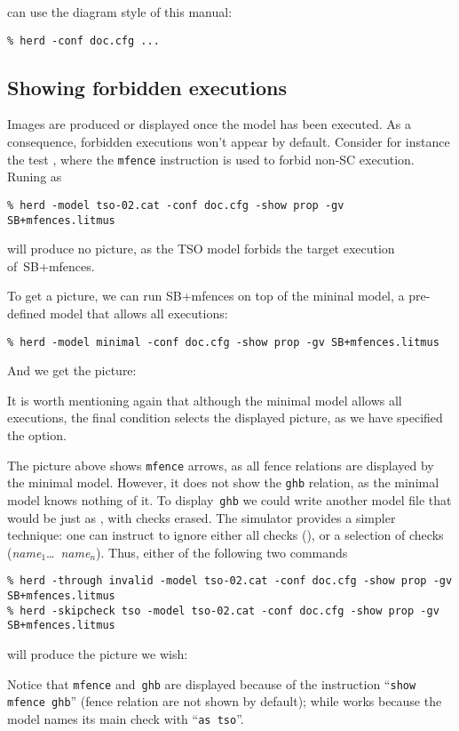can use the diagram style of this manual:
\begin{verbatim}
% herd -conf doc.cfg ...
\end{verbatim}

\subsection{\label{show:forbidden}Showing forbidden executions}
Images are produced or displayed once the model has been executed.
As a consequence,
forbidden executions won't appear by default.
Consider for instance the test ,
where the \texttt{mfence} instruction is used to forbid
 non-SC execution. Runing \herd{} as
\begin{verbatim}
% herd -model tso-02.cat -conf doc.cfg -show prop -gv SB+mfences.litmus
\end{verbatim}
will produce no picture, as the TSO model forbids the target execution
of~\textsf{SB+mfences}.

To get a picture, we can run \textsf{SB+mfences} on top of the mininal
model, a pre-defined model that allows all executions:
\begin{verbatim}
% herd -model minimal -conf doc.cfg -show prop -gv SB+mfences.litmus
\end{verbatim}
And we get the picture:
\begin{center}\end{center}
It is worth mentioning again  that although the minimal model allows all
executions, the final condition
selects the displayed picture, as we have specified the
 option.


\label{name:check}The picture above shows \verb+mfence+ arrows, as all
fence relations are displayed by the minimal model.
However, it  does not show the \verb+ghb+ relation, as the minimal
model knows nothing of it.
To display~\verb+ghb+ we could write another model file that would be just as
, with checks erased.
The simulator \herd{} provides a simpler technique:
one can instruct \herd{} to ignore
either all checks (), or a selection of checks
(\textit{name$_1$}\ldots~\textit{name$_n$}).
Thus, either of the following two commands
\begin{verbatim}
% herd -through invalid -model tso-02.cat -conf doc.cfg -show prop -gv SB+mfences.litmus
% herd -skipcheck tso -model tso-02.cat -conf doc.cfg -show prop -gv SB+mfences.litmus
\end{verbatim}
will produce the picture we wish:
\begin{center}\end{center}
Notice that \verb+mfence+ and~\verb+ghb+ are displayed because
of the instruction ``\verb+show mfence ghb+'' (fence relation are not shown
by default);
while  works because the  model
names its main check with ``\verb+as tso+''.

